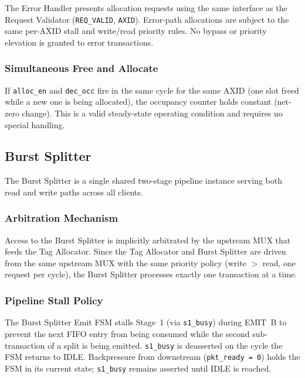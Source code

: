 The Error Handler presents allocation requests using the same interface as the
Request Validator (\texttt{REQ\_VALID}, \texttt{AXID}). Error-path allocations
are subject to the same per-AXID stall and write/read priority rules. No
bypass or priority elevation is granted to error transactions.

\subsubsection*{Simultaneous Free and Allocate}

If \texttt{alloc\_en} and \texttt{dec\_occ} fire in the same cycle for the
same AXID (one slot freed while a new one is being allocated), the occupancy
counter holds constant (net-zero change). This is a valid steady-state
operating condition and requires no special handling.

\subsection{Burst Splitter}

The Burst Splitter is a single shared two-stage pipeline instance serving both
read and write paths across all clients.

\subsubsection*{Arbitration Mechanism}

Access to the Burst Splitter is implicitly arbitrated by the upstream MUX that
feeds the Tag Allocator. Since the Tag Allocator and Burst Splitter are driven
from the same upstream MUX with the same priority policy (write $>$ read,
one request per cycle), the Burst Splitter processes exactly one transaction
at a time.

\subsubsection*{Pipeline Stall Policy}

The Burst Splitter Emit FSM stalls Stage~1 (via \texttt{s1\_busy}) during
\textsc{EMIT~B} to prevent the next FIFO entry from being consumed while the
second sub-transaction of a split is being emitted. \texttt{s1\_busy} is
deasserted on the cycle the FSM returns to \textsc{IDLE}. Backpressure from
downstream (\texttt{pkt\_ready = 0}) holds the FSM in its current state;
\texttt{s1\_busy} remains asserted until \textsc{IDLE} is reached.

